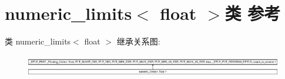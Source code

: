 \hypertarget{classnumeric__limits_3_01float_01_4}{}\section{numeric\+\_\+limits$<$ float $>$类 参考}
\label{classnumeric__limits_3_01float_01_4}
类 numeric\+\_\+limits$<$ float $>$ 继承关系图\+:\begin{figure}[H]
\begin{center}
\leavevmode
\includegraphics[height=0.982456cm]{classnumeric__limits_3_01float_01_4}
\end{center}
\end{figure}
